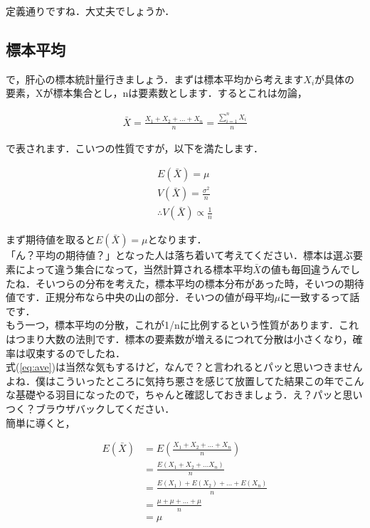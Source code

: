 \documentclass[11pt,a4paper,uplatex]{ujreport} 	%
\begin{document}
定義通りですね．大丈夫でしょうか．\\

\subsection{標本平均}
で，肝心の標本統計量行きましょう．まずは標本平均から考えます$X_i$が具体の要素，Xが標本集合とし，nは要素数とします．するとこれは勿論，

\begin{align}
  \bar{X} = \frac{X_1 + X_2+...+X_n}{n} = \frac{\sum_{i=1}^n X_i}{n}
\end{align}

で表されます．こいつの性質ですが，以下を満たします．

\begin{align}
  E(\bar{X}) = \mu
  \label{eq:ave}\\
  V(\bar{X}) = \frac{\sigma^2}{n}\\
  \therefore V(\bar{X}) \propto \frac{1}{n}
  \label{eq:var}
\end{align}
  
まず期待値を取ると$E(\bar{X}) = \mu$となります．\\

「ん？平均の期待値？」となった人は落ち着いて考えてください．標本は選ぶ要素によって違う集合になって，当然計算される標本平均$\bar{X}$の値も毎回違うんでしたね．そいつらの分布を考えた，標本平均の標本分布があった時，そいつの期待値です．正規分布なら中央の山の部分．そいつの値が母平均$\mu$に一致するって話です．\\

もう一つ，標本平均の分散，これが1/nに比例するという性質があります．これはつまり大数の法則です．標本の要素数が増えるにつれて分散は小さくなり，確率は収束するのでしたね．\\

式(\ref{eq:ave})は当然な気もするけど，なんで？と言われるとパッと思いつきませんよね．僕はこういったところに気持ち悪さを感じて放置してた結果この年でこんな基礎やる羽目になったので，ちゃんと確認しておきましょう．え？パッと思いつく？ブラウザバックしてください．\\

簡単に導くと，

\begin{align}
  E(\bar{X}) &= E(\frac{X_1 + X_2 + ...+X_n}{n})\\
             &= \frac{E(X_1+X_2+...X_n)}{n}\\
             &= \frac{E(X_1) + E(X_2)+...+E(X_n)}{n}\\
             &= \frac{\mu+\mu+...+\mu}{n}\\
             &=\mu 
\end{align}
\end{document}
